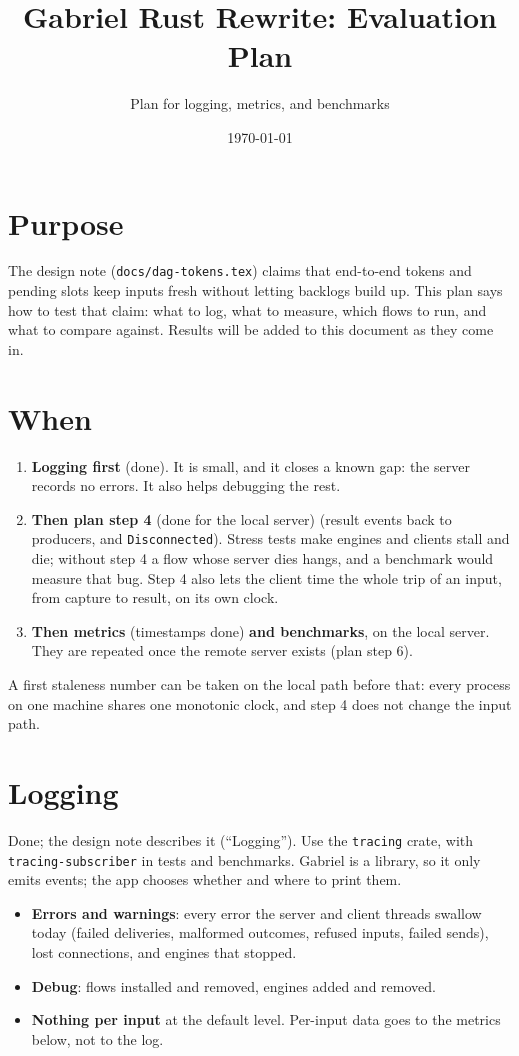 \documentclass[11pt]{article}
\title{Gabriel Rust Rewrite: Evaluation Plan}
\author{Plan for logging, metrics, and benchmarks}
\date{\today}
\newcommand{\code}[1]{\texttt{#1}}
\begin{document}
\maketitle

\section{Purpose}

The design note (\code{docs/dag-tokens.tex}) claims that end-to-end tokens
and pending slots keep inputs fresh without letting backlogs build up. This
plan says how to test that claim: what to log, what to measure, which flows to
run, and what to compare against. Results will be added to this document as
they come in.

\section{When}

\begin{enumerate}[nosep]
  \item \textbf{Logging first} (done). It is small, and it closes a known gap: the
        server records no errors. It also helps debugging the rest.
  \item \textbf{Then plan step 4} (done for the local server) (result events back to producers, and
        \code{Disconnected}). Stress tests make engines and clients stall and
        die; without step 4 a flow whose server dies hangs, and a benchmark
        would measure that bug. Step 4 also lets the client time the whole
        trip of an input, from capture to result, on its own clock.
  \item \textbf{Then metrics} (timestamps done) \textbf{and benchmarks}, on
        the local server. They are repeated once the remote server exists
        (plan step 6).
\end{enumerate}
A first staleness number can be taken on the local path before that: every
process on one machine shares one monotonic clock, and step 4 does not change
the input path.

\section{Logging}

Done; the design note describes it (``Logging''). Use the \code{tracing} crate, with \code{tracing-subscriber} in tests and
benchmarks. Gabriel is a library, so it only emits events; the app chooses
whether and where to print them.
\begin{itemize}[nosep]
  \item \textbf{Errors and warnings}: every error the server and client
        threads swallow today (failed deliveries, malformed outcomes, refused
        inputs, failed sends), lost connections, and engines that stopped.
  \item \textbf{Debug}: flows installed and removed, engines added and
        removed.
  \item \textbf{Nothing per input} at the default level. Per-input data goes
        to the metrics below, not to the log.
\end{itemize}
\end{document}
